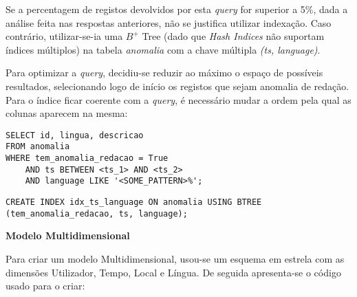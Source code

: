 \documentclass[12pt]{report}
\begin{document}
    \par Se a percentagem de registos devolvidos por esta \textit{query} for superior a 5\%, dada a análise feita nas respostas anteriores, não se justifica utilizar indexação. Caso contrário, utilizar-se-ia uma $B^+$ Tree (dado que \textit{Hash Indices} não suportam índices múltiplos) na tabela \textit{anomalia} com a chave múltipla \textit{(ts, language)}.
    \par Para optimizar a \textit{query}, decidiu-se reduzir ao máximo o espaço de possíveis resultados, selecionando logo de início os registos que sejam anomalia de redação. Para o índice ficar coerente com a \textit{query}, é necessário mudar a ordem pela qual as colunas aparecem na mesma:
    \footnotesize
    \begin{verbatim}
SELECT id, lingua, descricao
FROM anomalia
WHERE tem_anomalia_redacao = True
    AND ts BETWEEN <ts_1> AND <ts_2>
    AND language LIKE '<SOME_PATTERN>%';
    \end{verbatim}
    \normalsize


    \footnotesize \begin{verbatim}
CREATE INDEX idx_ts_language ON anomalia USING BTREE (tem_anomalia_redacao, ts, language);
    \end{verbatim}\normalsize

    \Large
    \textbf{Modelo Multidimensional}\\
    \normalsize
    \par Para criar um modelo Multidimensional, usou-se um esquema em estrela com as dimensões Utilizador, Tempo, Local e Língua. De seguida apresenta-se o código usado para o criar:
\end{document}
